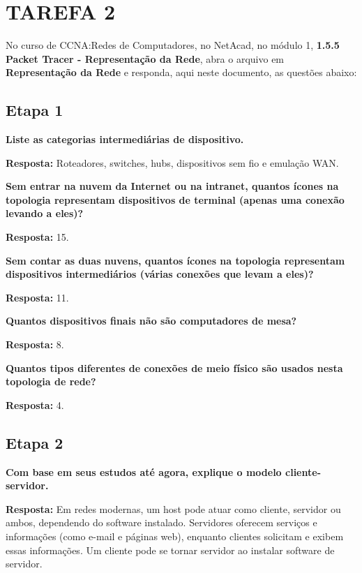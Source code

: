 \documentclass[12pt,a4paper]{article}
\newcommand{\resposta}[1]{\textbf{Resposta:} #1}
\begin{document}
\vspace{1.2em}
\section*{TAREFA 2}
No curso de CCNA:Redes de Computadores, no NetAcad, no módulo 1, \textbf{1.5.5 Packet Tracer - Representação da Rede}, abra o arquivo em \textbf{Representação da Rede} e responda, aqui neste documento, as questões abaixo:

\subsection*{Etapa 1}
\noindent\textbf{Liste as categorias intermediárias de dispositivo.}

\resposta{Roteadores, switches, hubs, dispositivos sem fio e emulação WAN.}

\vspace{0.8em}
\noindent\textbf{Sem entrar na nuvem da Internet ou na intranet, quantos ícones na topologia representam dispositivos de terminal (apenas uma conexão levando a eles)?}

\resposta{15.}

\vspace{0.8em}
\noindent\textbf{Sem contar as duas nuvens, quantos ícones na topologia representam dispositivos intermediários (várias conexões que levam a eles)?}

\resposta{11.}

\vspace{0.8em}
\noindent\textbf{Quantos dispositivos finais não são computadores de mesa?}

\resposta{8.}

\vspace{0.8em}
\noindent\textbf{Quantos tipos diferentes de conexões de meio físico são usados nesta topologia de rede?}

\resposta{4.}

\subsection*{Etapa 2}
\noindent\textbf{Com base em seus estudos até agora, explique o modelo cliente-servidor.}

\resposta{Em redes modernas, um host pode atuar como cliente, servidor ou ambos, dependendo do software instalado. Servidores oferecem serviços e informações (como e-mail e páginas web), enquanto clientes solicitam e exibem essas informações. Um cliente pode se tornar servidor ao instalar software de servidor.}
\end{document}
